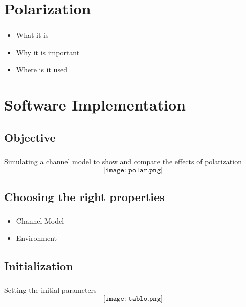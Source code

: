\documentclass[10pt,aspectratio=169]{beamer}
\begin{document}
	\section{Polarization}
	
	\begin{frame}
		\frametitle{\insertsection}
		\framesubtitle{\insertsubsection}
	
\begin{itemize}
\item What it is
\item Why it is important
\item Where is it used
\end{itemize}

		
	\end{frame}
	
    \section{Software Implementation}
    \subsection{Objective}
	\begin{frame}
		\frametitle{\insertsection}
		\framesubtitle{\insertsubsection}
		Simulating a channel model to show and compare the effects of polarization 
		\[\texttt{[image: polar.png]}\]
	\end{frame}
	
	\subsection{Choosing the right properties}
	\begin{frame}
		\frametitle{\insertsection}
		\framesubtitle{\insertsubsection}
\begin{itemize}
\item Channel Model
\item Environment
\end{itemize}
	\end{frame}
	\subsection{Initialization}
	\begin{frame}
		\frametitle{\insertsection}
		\framesubtitle{\insertsubsection}
	  Setting the initial parameters
	  \[\texttt{[image: tablo.png]}\]
	\end{frame}
\end{document}
